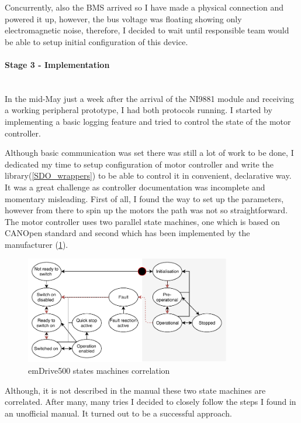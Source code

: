Concurrently, also the BMS arrived so I have made a physical connection and powered it up, however, the bus voltage was floating showing only electromagnetic noise, therefore, I decided to wait until responsible team would be able to setup initial configuration of this device.

\paragraph{Stage 3 - Implementation}   
\addtocounter{section}{1}
\mbox{}\\
In the mid-May just a week after the arrival of the NI9881 module and receiving a working peripheral prototype, I had both protocols running. I started by implementing a basic logging feature and tried to control the state of the motor controller. 

Although basic communication was set there was still a lot of work to be done, I dedicated my time to setup configuration of motor controller and write the library(\ref{SDO_wrappers}) to be able to control it in convenient, declarative way.
It was a great challenge as controller documentation was incomplete and momentary misleading. First of all, I found the way to set up the parameters, however from there to spin up the motors the path was not so straightforward. 
The motor controller uses two parallel state machines, one which is based on CANOpen standard and second which has been implemented by the manufacturer (\ref{fig:em500_states}). 
\begin{figure}[H]
    \centering
    \includegraphics[width=0.8\textwidth]{figures/em500_state}
    \caption{emDrive500 states machines correlation}
    \label{fig:em500_states}
\end{figure}
Although, it is not described in the manual these two state machines are correlated. After many, many tries I decided to closely follow the steps I found in an unofficial manual. It turned out to be a successful approach. 

